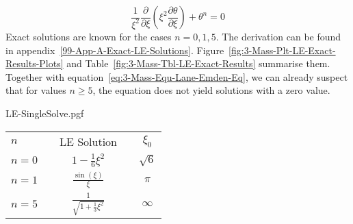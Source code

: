 \begin{equation}
	\frac{1}{\xi^2}\frac{\partial}{\partial\xi}\left(\xi^2\frac{\partial\theta}{\partial\xi}\right) + \theta^n=0
	\label{eq:3-Mass-Equ-Lane-Emden-Eq}
\end{equation}
Exact solutions are known for the cases $n=0,1,5$.
The derivation can be found in appendix~\ref{99-App-A-Exact-LE-Solutions}.
Figure~\ref{fig:3-Mass-Plt-LE-Exact-Results-Plots} and Table~\ref{fig:3-Mass-Tbl-LE-Exact-Results} summarise them.
Together with equation~\eqref{eq:3-Mass-Equ-Lane-Emden-Eq}, we can already suspect that for values $n\geq5$, the equation does not yield solutions with a zero value.\\
\noindent
\begin{minipage}{0.5\textwidth}
	\centering
	{LE-SingleSolve.pgf}
\end{minipage}\hfill%
\begin{minipage}{0.45\textwidth}
	\renewcommand{\arraystretch}{1.2}
	\begin{tabular}[b]{@{}lcccc@{}}
		\toprule
		$n$ & \phantom{ab} & \ac{LE} Solution & \phantom{ab} & $\xi_0$\\
		\cmidrule{1-5}
		$n=0$ && $\displaystyle 1-\frac{1}{6}\xi^2$ && $\sqrt{6}$\\[3ex]
		$n=1$ && $\displaystyle \frac{\sin(\xi)}{\xi}$ && $\pi$\\[3ex]
		$n=5$ && $\displaystyle \frac{1}{\sqrt{1+\frac{1}{3}\xi^2}}$ && $\infty$\\[2ex]
		\bottomrule
	\end{tabular}
\end{minipage}
